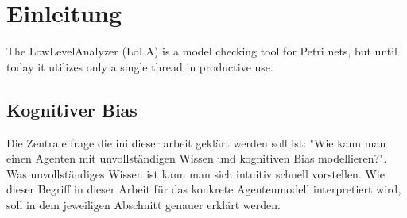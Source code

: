 \chapter{Einleitung}
\label{introduction}

The LowLevelAnalyzer (LoLA) is a model checking tool for Petri nets, but until today it utilizes only a single thread in productive use.

\section{Kognitiver Bias}
Die Zentrale frage die ini dieser arbeit geklärt werden soll ist: "Wie kann man einen Agenten mit unvollständigen Wissen und kognitiven Bias modellieren?". 
Was unvollständiges Wissen ist kann man sich intuitiv schnell vorstellen. Wie dieser Begriff in dieser Arbeit für das konkrete Agentenmodell interpretiert wird, soll in dem jeweiligen Abschnitt genauer erklärt werden.